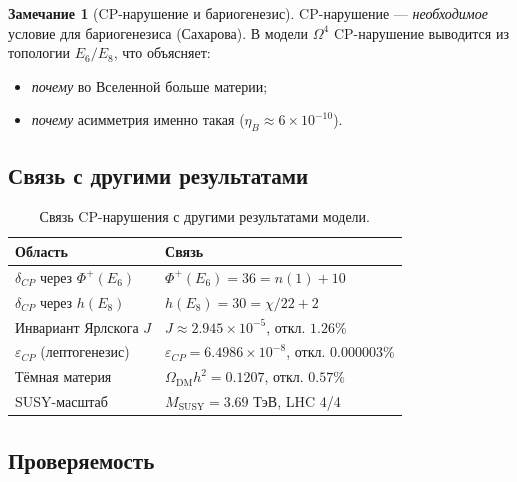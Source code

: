 \documentclass[11pt,a4paper]{article}
\newcommand{\Om}{\Omega^4}
\newcommand{\MSUSY}{M_{\text{SUSY}}}
\theoremstyle{definition}
\newtheorem{remark}[theorem]{Замечание}
\begin{document}
\begin{remark}[CP-нарушение и бариогенезис]
\label{rem:cp-baryogenesis}
CP-нарушение — \emph{необходимое} условие для бариогенезиса 
(Сахарова). В модели $\Om$ CP-нарушение выводится из 
топологии $E_6/E_8$, что объясняет:
\begin{itemize}
    \item \emph{почему} во Вселенной больше материи;
    \item \emph{почему} асимметрия именно такая 
          ($\eta_B \approx 6 \times 10^{-10}$).
\end{itemize}
\end{remark}

\subsection{Связь с другими результатами}
\label{subsec:cp-links}

\begin{table}[htbp]
\centering
\caption{Связь CP-нарушения с другими результатами модели.}
\label{tab:cp-links}
\begin{tabular}{p{4cm}p{7cm}}
\toprule
Область & Связь \\ 
\midrule
$\delta_{CP}$ через $\Phi^+(E_6)$ & 
    $\Phi^+(E_6) = 36 = n(1) + 10$ \\[0.3em]
$\delta_{CP}$ через $h(E_8)$ & 
    $h(E_8) = 30 = \chi/22 + 2$ \\[0.3em]
Инвариант Ярлскога $J$ & 
    $J \approx 2.945 \times 10^{-5}$, откл. $1.26\%$ \\[0.3em]
$\varepsilon_{CP}$ (лептогенезис) & 
    $\varepsilon_{CP} = 6.4986 \times 10^{-8}$, откл. $0.000003\%$ \\[0.3em]
Тёмная материя & 
    $\Omega_{\text{DM}} h^2 = 0.1207$, откл. $0.57\%$ \\[0.3em]
SUSY-масштаб & 
    $\MSUSY = 3.69$ ТэВ, LHC 4/4 \\ 
\bottomrule
\end{tabular}
\end{table}

\subsection{Проверяемость}
\label{subsec:cp-falsifiability}
\end{document}
